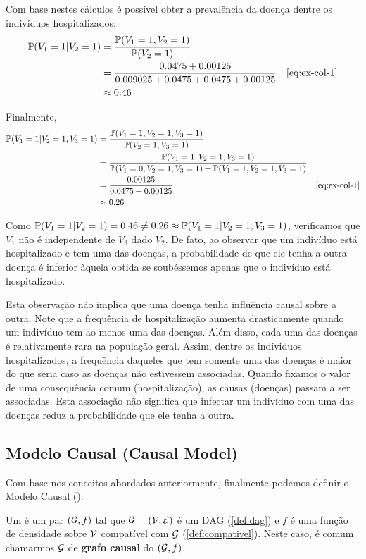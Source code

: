Com base nestes cálculos é possível obter
a prevalência da doença dentre os indivíduos hospitalizados:
\begin{align*}
 \P(V_1=1|V_2=1) 
 &= \frac{\P(V_1=1,V_2=1)}{\P(V_2=1)} \\
 &= \frac{0.0475 + 0.00125}{0.009025 + 0.0475 + 0.0475 + 0.00125} 
 & \text{\cref{eq:ex-col-1}} \\
 &\approx 0.46
\end{align*}

Finalmente,
\begin{align*}
 \P(V_1 = 1|V_2 = 1, V_3 = 1)
 &= \frac{\P(V_1=1,V_2=1,V_3=1)}{\P(V_2=1,V_3=1)} \\
 &= \frac{\P(V_1=1,V_2=1,V_3=1)}
 {\P(V_1=0,V_2=1,V_3=1) + \P(V_1=1,V_2=1,V_3=1)} \\
 &= \frac{0.00125}{0.0475 + 0.00125} & \text{\cref{eq:ex-col-1}} \\
 &\approx 0.26 
\end{align*}

Como $\P(V_1=1|V_2=1) = 0.46 \neq 0.26 \approx \P(V_1=1|V_2=1,V_3=1)$,
verificamos que $V_1$ não é independente de $V_3$ dado $V_2$.
De fato, ao observar que um indivíduo está hospitalizado e
tem uma das doenças, a probabilidade de que ele tenha
a outra doença é inferior àquela obtida se soubéssemos apenas
que o indivíduo está hospitalizado.

Esta observação 
não implica que uma doença tenha influência causal sobre a outra.
Note que a frequência de hospitalização aumenta 
drasticamente quando um indivíduo tem ao menos uma das doenças.
Além disso, cada uma das doenças é relativamente rara na população geral.
Assim, dentre os indíviduos hospitalizados,
a frequência daqueles que tem somente uma das doenças é
maior do que seria caso as doenças não estivessem associadas.
Quando fixamos o valor de uma consequência comum (hospitalização),
as causas (doenças) passam a ser associadas.
Esta associação não significa que
infectar um indivíduo com uma das doenças
reduz a probabilidade que ele tenha a outra.

\subsection{Modelo Causal (Causal Model)}

Com base nos conceitos abordados anteriormente,
finalmente podemos definir
o Modelo Causal (\CM):

\begin{definition}
 \label{def:cm}
 Um \CM é um par $(\sG,f)$ tal que
 $\sG = (\sV, \sE)$ é um DAG (\cref{def:dag}) e
 $f$ é uma função de densidade sobre $\sV$
 compatível com $\sG$ (\cref{def:compativel}).
 Neste caso, é comum chamarmos $\sG$ de
 \textbf{grafo causal} do \CM $(\sG,f)$.
\end{definition}

